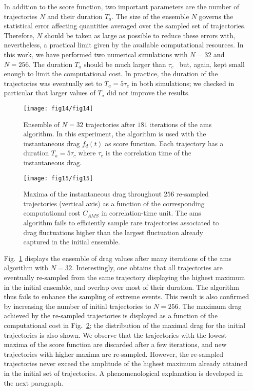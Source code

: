 In addition to the score function, two important parameters are the number of trajectories $N$ and their duration $T_a$.
  The size of the ensemble $N$ governs the statistical error affecting quantities averaged over the sampled set of trajectories. Therefore, $N$ should be taken as large as possible to reduce these errors with, nevertheless, a practical limit given by the available computational resources. In this work, we have performed two numerical simulations with $N=32$ and $N=256$.
The duration $T_a$ should be much larger than $\tau_c$~\citep{lestang_computing_2018} but, again, kept small enough to limit the computational cost. In practice, the duration of the trajectories was eventually set to $T_a=5\tau_c$ in both simulations; we checked in particular that larger values of $T_a$ did not improve the results.

\begin{figure}
	\centering
	\texttt{[image: fig14/fig14]}
	\caption{\label{fig:AMS_drag_trajectories} Ensemble of $N = 32$ trajectories after $181$ iterations of the \ac{ams} algorithm. In this experiment, the algorithm is used with the instantaneous drag $f_d(t)$ as score function. Each trajectory has a duration $T_a = 5\tau_c$  where $\tau_c$ is the correlation time of the instantaneous drag.}
\end{figure}

\begin{figure}
	\centering
	\texttt{[image: fig15/fig15]}
	\caption{\label{fig:AMS_drag_resampling} Maxima of the instantaneous drag throughout $256$ re-sampled trajectories (vertical axis) as a function of the corresponding computational cost $C_{AMS}$ in correlation-time unit. The \ac{ams} algorithm fails to efficiently sample rare trajectories associated to drag fluctuations higher than the largest fluctuation already captured in the initial ensemble.}
\end{figure}

%
Fig.~\ref{fig:AMS_drag_trajectories} displays the ensemble of drag values after many iterations of the \ac{ams} algorithm with $N=32$. 
%
Interestingly, one obtains that all trajectories are eventually re-sampled from the same trajectory displaying the highest maximum in the initial ensemble, and overlap over most of their duration.
%
The algorithm thus fails to enhance the sampling of extreme events. 
This result is also confirmed by increasing the number of initial trajectories to $N=256$.
%
The maximum drag achieved by the re-sampled trajectories is displayed as a function of the computational cost in Fig.~\ref{fig:AMS_drag_resampling};  
%
%
the distribution of the maximal drag for the {initial} trajectories is also shown.
We observe that the trajectories with the lowest maxima of the score function are discarded after a few iterations, and new trajectories with higher maxima are re-sampled. 
However, the re-sampled trajectories never exceed the amplitude of the highest maximum already attained in the initial set of trajectories. A phenomenological explanation is developed in the next paragraph.
%

